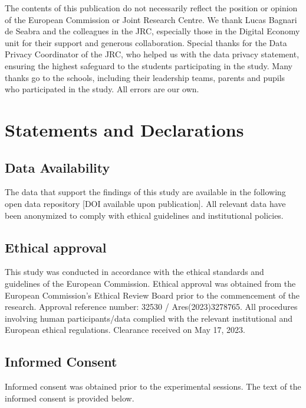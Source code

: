 \documentclass[
  11pt,
]{article}
\begin{document}
The contents of this publication do not necessarily reflect the position or opinion of the European Commission or Joint Research Centre. We thank Lucas Bagnari de Seabra and the colleagues in the JRC, especially those in the Digital Economy unit for their support and generous collaboration. Special thanks for the Data Privacy Coordinator of the JRC, who helped us with the data privacy statement, ensuring the highest safeguard to the students participating in the study. Many thanks go to the schools, including their leadership teams, parents and pupils who participated in the study. All errors are our own.

\section{Statements and Declarations}\label{statements-and-declarations}

\subsection{Data Availability}\label{data-availability}

The data that support the findings of this study are available in the following open data repository {[}DOI available upon publication{]}. All relevant data have been anonymized to comply with ethical guidelines and institutional policies.

\subsection{Ethical approval}\label{ethical-approval}

This study was conducted in accordance with the ethical standards and guidelines of the European Commission. Ethical approval was obtained from the European Commission's Ethical Review Board prior to the commencement of the research. Approval reference number: 32530 / Ares(2023)3278765. All procedures involving human participants/data complied with the relevant institutional and European ethical regulations. Clearance received on May 17, 2023.

\subsection{Informed Consent}\label{informed-consent}

Informed consent was obtained prior to the experimental sessions. The text of the informed consent is provided below.
\end{document}
